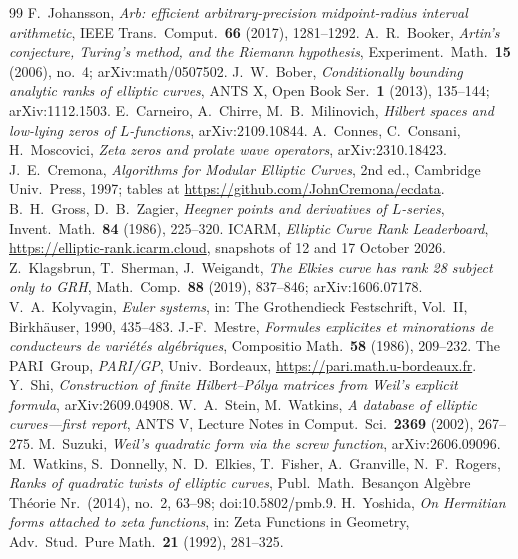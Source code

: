 \documentclass[11pt]{amsart}
\theoremstyle{remark}
\theoremstyle{definition}
\begin{document}
\begin{thebibliography}{99}
 F.~Johansson, \emph{Arb: efficient arbitrary-precision midpoint-radius interval arithmetic}, IEEE Trans.\ Comput.\ \textbf{66} (2017), 1281--1292.
 A.~R.~Booker, \emph{Artin's conjecture, Turing's method, and the Riemann hypothesis}, Experiment.\ Math.\ \textbf{15} (2006), no.~4; arXiv:math/0507502.
 J.~W.~Bober, \emph{Conditionally bounding analytic ranks of elliptic curves}, ANTS X, Open Book Ser.\ \textbf{1} (2013), 135--144; arXiv:1112.1503.
 E.~Carneiro, A.~Chirre, M.~B.~Milinovich, \emph{Hilbert spaces and low-lying zeros of $L$-functions}, arXiv:2109.10844.
 A.~Connes, C.~Consani, H.~Moscovici, \emph{Zeta zeros and prolate wave operators}, arXiv:2310.18423.
 J.~E.~Cremona, \emph{Algorithms for Modular Elliptic Curves}, 2nd ed., Cambridge Univ.\ Press, 1997; tables at \url{https://github.com/JohnCremona/ecdata}.
 B.~H.~Gross, D.~B.~Zagier, \emph{Heegner points and derivatives of $L$-series}, Invent.\ Math.\ \textbf{84} (1986), 225--320.
 ICARM, \emph{Elliptic Curve Rank Leaderboard}, \url{https://elliptic-rank.icarm.cloud}, snapshots of 12 and 17 October 2026.
 Z.~Klagsbrun, T.~Sherman, J.~Weigandt, \emph{The Elkies curve has rank 28 subject only to GRH}, Math.\ Comp.\ \textbf{88} (2019), 837--846; arXiv:1606.07178.
 V.~A.~Kolyvagin, \emph{Euler systems}, in: The Grothendieck Festschrift, Vol.~II, Birkh\"auser, 1990, 435--483.
 J.-F.~Mestre, \emph{Formules explicites et minorations de conducteurs de vari\'et\'es alg\'ebriques}, Compositio Math.\ \textbf{58} (1986), 209--232.
 The PARI~Group, \emph{PARI/GP}, Univ.\ Bordeaux, \url{https://pari.math.u-bordeaux.fr}.
 Y.~Shi, \emph{Construction of finite Hilbert--P\'olya matrices from Weil's explicit formula}, arXiv:2609.04908.
 W.~A.~Stein, M.~Watkins, \emph{A database of elliptic curves---first report}, ANTS V, Lecture Notes in Comput.\ Sci.\ \textbf{2369} (2002), 267--275.
 M.~Suzuki, \emph{Weil's quadratic form via the screw function}, arXiv:2606.09096.
 M.~Watkins, S.~Donnelly, N.~D.~Elkies, T.~Fisher, A.~Granville, N.~F.~Rogers, \emph{Ranks of quadratic twists of elliptic curves}, Publ.\ Math.\ Besan\c{c}on Alg\`ebre Th\'eorie Nr.\ (2014), no.~2, 63--98; doi:10.5802/pmb.9.
 H.~Yoshida, \emph{On Hermitian forms attached to zeta functions}, in: Zeta Functions in Geometry, Adv.\ Stud.\ Pure Math.\ \textbf{21} (1992), 281--325.
\end{thebibliography}
\end{document}
